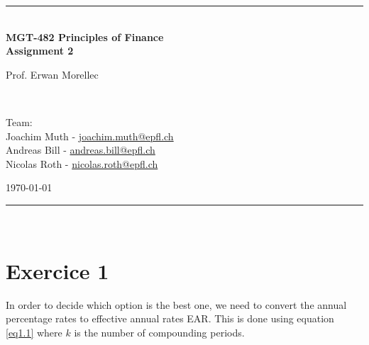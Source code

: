 \documentclass[a4paper,11pt,twoside]{article}
\newcommand{\mail}[1]{{\href{mailto:#1}{#1}}}
\begin{document}
\begin{titlepage} %
\begin{center}
\newcommand{\HRule}{\rule{\linewidth}{0.5mm}} %
\center %
 
 




\begin{figure} [h] %
\centerline{
} 
\end{figure}

\HRule \\[0.4cm]
{ \huge \bfseries MGT-482 Principles of Finance \\Assignment 2}\\[0.4cm] %

\begin{minipage}[t]{0.4\textwidth}
\flushleft
Prof. Erwan Morellec
\end{minipage}
~
\begin{minipage}[t]{0.55\textwidth}
\flushright
Team: \\
Joachim Muth - \mail{joachim.muth@epfl.ch}\\
Andreas Bill - \mail{andreas.bill@epfl.ch}\\
Nicolas Roth - \mail{nicolas.roth@epfl.ch}\\
\end{minipage}
\begin{center}
\today
\end{center}
\HRule \\

\end{center}
\end{titlepage}



\pagestyle{fancy}
\section{Exercice 1}

In order to decide which option is the best one, we need to convert the annual percentage rates to effective annual rates EAR. This is done using equation \ref{eq1.1} where $k$ is the number of compounding periods.
\end{document}
